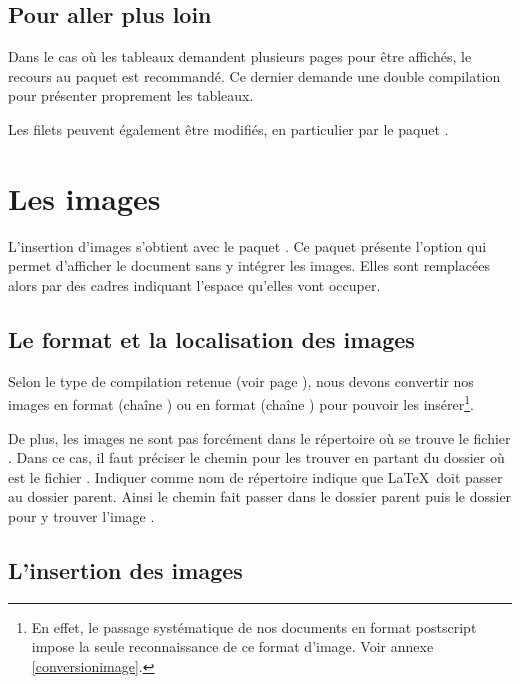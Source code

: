 \subsection{Pour aller plus loin}

Dans le cas où les tableaux demandent plusieurs pages pour être affichés, le recours au paquet  est recommandé. Ce dernier demande une double compilation pour présenter proprement les tableaux.

Les filets peuvent également être modifiés, en particulier par le paquet .

\section{Les images} \label{images}   

L'insertion d'images s'obtient avec le paquet . Ce paquet présente l'option  qui permet d'afficher le document sans y intégrer les images. Elles sont remplacées alors par des cadres indiquant l'espace qu'elles vont occuper.

\subsection{Le format et la localisation des images}

Selon le type de compilation retenue (voir page \pageref{compilation}), nous devons convertir nos images en format  (chaîne ) ou en format  (chaîne ) pour pouvoir les insérer\footnote{En effet, le passage systématique de nos documents en format postscript impose la seule reconnaissance de ce format d'image. Voir annexe \ref{conversionimage}.}. 

De plus, les images ne sont pas forcément dans le répertoire où se trouve le fichier . Dans ce cas, il faut préciser le chemin pour les trouver en partant du dossier où est le fichier . Indiquer comme nom de répertoire  indique que \LaTeX\ doit passer au dossier parent. Ainsi le chemin  fait passer dans le dossier parent puis le dossier  pour y trouver l'image .

\subsection{L'insertion des images}

